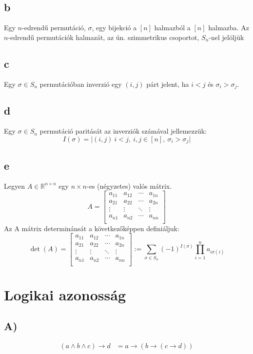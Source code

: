 \documentclass{article}
\begin{document}
\subsection{b}
Egy \(n\)-edrendű permutáció, \(\sigma\), egy bijekció a \([n]\) halmazból a \([n]\) halmazba. Az \(n\)-edrendű permutációk halmazát, az ún. szimmetrikus csoportot, \(S_n\)-nel jelöljük
 
\subsection{c}
Egy \(\sigma \in S_n\) permutációban inverzió egy \((i, j)\) párt jelent, ha \(i < j\) és \(\sigma_i > \sigma_j\).
 
\subsection{d}
Egy \(\sigma \in S_n\) permutáció paritását az inverziók számával jellemezzük:
\[ I(\sigma) = {|(i, j) \ i < j,\ i, j \in [n],\ \sigma_i > \sigma_j}| \]
 
\subsection{e}
Legyen \(A \in \mathbb{R}^{n \times n}\) egy \(n \times n\)-es (négyzetes) valós mátrix.
\[ A =
\begin{bmatrix}
a_{11} & a_{12} & \cdots & a_{1n} \\
a_{21} & a_{22} & \cdots & a_{2n} \\
\vdots  & \vdots  & \ddots & \vdots  \\
a_{n1} & a_{n2} & \cdots & a_{nn} \\
\end{bmatrix}
\]
Az A mátrix determinánsát a következőképpen definiáljuk:
\[
\det(A) = \begin{bmatrix}
a_{11} & a_{12} & \cdots & a_{1n} \\
a_{21} & a_{22} & \cdots & a_{2n} \\
\vdots  & \vdots  & \ddots & \vdots  \\
a_{n1} & a_{n2} & \cdots & a_{nn} \\
\end{bmatrix} := \sum_{\sigma \in S_n} (-1)^{I(\sigma)} \prod_{i=1}^{n} a_{i\sigma(i)}
\]
 
\section{Logikai azonosság}
\subsection{A)}
\begin{align*}
(a \land b \land c) \rightarrow d & =  a \rightarrow (b \rightarrow (c \rightarrow d)) \\
\end{align*}
 
\end{document}
